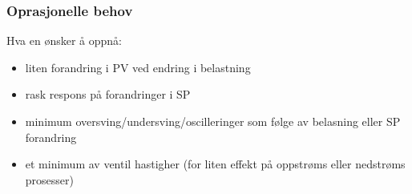 \documentclass[aspectratio=169,xcolor=dvipsnames]{beamer}
\begin{document}
%
%
%
%
%
%
%
%
	\begin{frame}
		\frametitle{Oprasjonelle behov}
		Hva en ønsker å oppnå:\begin{itemize}
			\item liten forandring i PV ved endring i belastning
			\item rask respons på forandringer i SP
			\item minimum oversving/undersving/oscilleringer som følge av belasning eller SP forandring
			\item et minimum av ventil hastigher (for liten effekt på oppstrøms eller nedstrøms prosesser)
		\end{itemize}

		
	\end{frame}
\end{document}

